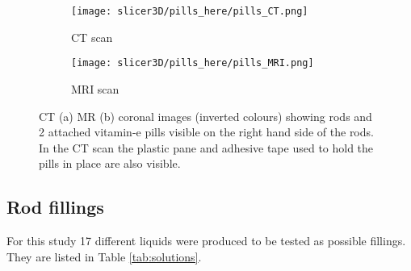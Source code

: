 \begin{figure}[!thb]
\centering
  \begin{subfigure}[b]{0.45\textwidth}
  \centering
    \texttt{[image: slicer3D/pills\_here/pills\_CT.png]}
    \caption{CT scan}
    \label{fig:pills_CT}
  \end{subfigure}
  \begin{subfigure}[b]{0.45\textwidth}
  \centering
      \texttt{[image: slicer3D/pills\_here/pills\_MRI.png]}
    \caption{MRI scan}
    \label{fig:pills_MR}
  \end{subfigure}
  \caption[Coronal CT and MRI images showing rods and 2 attached vitamin-e pills]{CT (a) MR (b) coronal images (inverted colours) showing rods and 2 attached vitamin-e pills visible on the right hand side of the rods. In the CT scan the plastic pane and adhesive tape used to hold the pills in place are also visible.}
  \label{fig:pills}
\end{figure}

\clearpage

\subsection{Rod fillings}

For this study 17 different liquids were produced to be tested as possible fillings.
They are listed in Table \ref{tab:solutions}.


